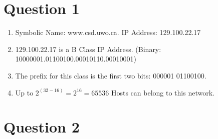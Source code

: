 \documentclass[12pt,letterpaper]{article}
\begin{document}
\section*{Question 1}

\begin{enumerate}
   \item Symbolic Name: www.csd.uwo.ca. IP Address: 129.100.22.17
   \item 129.100.22.17 is a B Class IP Address. (Binary: 10000001.01100100.00010110.00010001)
   \item The prefix for this class is the first two bits: 000001 01100100.
   \item Up to $2^{(32-16)}=2^{16}=65536$ Hosts can belong to this network.
\end{enumerate}


\section*{Question 2}
\end{document}
